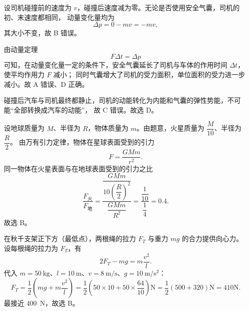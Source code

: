 
\begin{answer}
设司机碰撞前的速度为 $v$，碰撞后速度减为零。无论是否使用安全气囊，司机的初、末速度都相同，
动量变化量均为
\[
  \Delta p=0-mv=-mv,
\]
其大小不变，故 B 错误。

由动量定理
\[
  F\Delta t=\Delta p
\]
可知，在动量变化量一定的条件下，安全气囊延长了司机与车体的作用时间 $\Delta t$，使平均作用力 $F$ 减小；
同时气囊增大了司机的受力面积，单位面积的受力进一步减小。故 A 错误、D 正确。

碰撞后汽车与司机最终都静止，司机的动能转化为内能和气囊的弹性势能，不可能“全部转换成汽车的动能”，
故 C 错误。故选 D。
\end{answer}

\begin{answer}
设地球质量为 $M$、半径为 $R$，物体质量为 $m$。由题意，火星质量为 $\dfrac{M}{10}$、半径为 $\dfrac{R}{2}$。
由万有引力定律，物体在星球表面受到的引力
\[
  F=\frac{GMm}{r^{2}}.
\]
同一物体在火星表面与在地球表面受到的引力之比
\[
  \frac{F_{\text{火}}}{F_{\text{地}}}
  =\frac{\dfrac{GMm}{10\left(\dfrac{R}{2}\right)^{2}}}{\dfrac{GMm}{R^{2}}}
  =\frac{\dfrac{1}{10}}{\dfrac{1}{4}}
  =0.4.
\]
故选 B。
\end{answer}

\begin{answer}
在秋千支架正下方（最低点），两根绳的拉力 $F_T$ 与重力 $mg$ 的合力提供向心力。设每根绳的拉力为 $F_T$，有
\[
  2F_T-mg=m\frac{v^{2}}{l}.
\]
代入 $m=\SI{50}{\kilogram}$、$l=\SI{10}{\metre}$、$v=\SI{8}{\metre\per\second}$、$g=\SI{10}{\metre\per\second\squared}$：
\[
  F_T=\frac{1}{2}\left(mg+m\frac{v^{2}}{l}\right)
      =\frac{1}{2}\left(50\times10+50\times\frac{64}{10}\right)\si{\newton}
      =\frac{1}{2}(500+320)\si{\newton}
      =410\si{\newton}.
\]
最接近 \SI{400}{\newton}，故选 B。
\end{answer}

